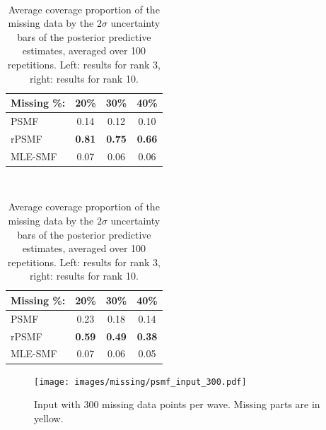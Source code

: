 \documentclass{mldsmsc}
\begin{document}
\begin{table}[H]
    \centering
    \begin{minipage}{0.45\textwidth}
        \centering
         \\[0.5ex]
        \begin{threeparttable}
            \begin{tabular}{lccc}
                \hline
                Missing \%: & 20\% & 30\% & 40\% \\
                \hline
                PSMF & 0.14 & 0.12 & 0.10 \\
                rPSMF & \textbf{0.81} & \textbf{0.75} & \textbf{0.66} \\
                MLE-SMF & 0.07 & 0.06 & 0.06 \\
                \hline
            \end{tabular}
        \end{threeparttable}
    \end{minipage}%
    \hspace{0.1\textwidth}%
    \begin{minipage}{0.45\textwidth}
        \centering
         \\[0.5ex]
        \begin{threeparttable}
            \begin{tabular}{lccc}
                \hline
                Missing \%: & 20\% & 30\% & 40\% \\
                \hline
                PSMF & 0.23 & 0.18 & 0.14 \\
                rPSMF & \textbf{0.59} & \textbf{0.49} & \textbf{0.38} \\
                MLE-SMF & 0.07 & 0.06 & 0.05 \\
                \hline
            \end{tabular}
        \end{threeparttable}
    \end{minipage}
    \caption{Average coverage proportion of the missing data by the $2\sigma$ uncertainty bars of the posterior predictive estimates, averaged over 100 repetitions. Left: results for rank 3, right: results for rank 10.}
\end{table}

\begin{figure}[H]
\centering
\texttt{[image: images/missing/psmf\_input\_300.pdf]}
\caption{Input with 300 missing data points per wave. Missing parts are in yellow.}
\label{fig:vs}
\end{figure}
\end{document}
